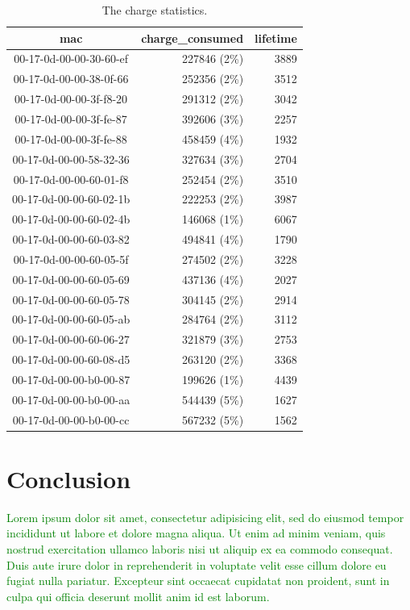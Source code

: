 \documentclass{sig-alternate}
\newcommand{\lorem}               {\textcolor{green}{Lorem ipsum dolor sit amet, consectetur adipisicing elit, sed do eiusmod tempor incididunt ut labore et dolore magna aliqua. Ut enim ad minim veniam, quis nostrud exercitation ullamco laboris nisi ut aliquip ex ea commodo consequat. Duis aute irure dolor in reprehenderit in voluptate velit esse cillum dolore eu fugiat nulla pariatur. Excepteur sint occaecat cupidatat non proident, sunt in culpa qui officia deserunt mollit anim id est laborum.}}
\begin{document}
\begin{table}
  \begin{tabular}{|c|r|r|}
     \hline
     mac                     & charge\_consumed & lifetime\\
     \hline
     00-17-0d-00-00-30-60-ef & 227846 (2\%)     & 3889\\
     00-17-0d-00-00-38-0f-66 & 252356 (2\%)     & 3512\\
     00-17-0d-00-00-3f-f8-20 & 291312 (2\%)     & 3042\\
     00-17-0d-00-00-3f-fe-87 & 392606 (3\%)     & 2257\\
     00-17-0d-00-00-3f-fe-88 & 458459 (4\%)     & 1932\\
     00-17-0d-00-00-58-32-36 & 327634 (3\%)     & 2704\\
     00-17-0d-00-00-60-01-f8 & 252454 (2\%)     & 3510\\
     00-17-0d-00-00-60-02-1b & 222253 (2\%)     & 3987\\
     00-17-0d-00-00-60-02-4b & 146068 (1\%)     & 6067\\
     00-17-0d-00-00-60-03-82 & 494841 (4\%)     & 1790\\
     00-17-0d-00-00-60-05-5f & 274502 (2\%)     & 3228\\
     00-17-0d-00-00-60-05-69 & 437136 (4\%)     & 2027\\
     00-17-0d-00-00-60-05-78 & 304145 (2\%)     & 2914\\
     00-17-0d-00-00-60-05-ab & 284764 (2\%)     & 3112\\
     00-17-0d-00-00-60-06-27 & 321879 (3\%)     & 2753\\
     00-17-0d-00-00-60-08-d5 & 263120 (2\%)     & 3368\\
     00-17-0d-00-00-b0-00-87 & 199626 (1\%)     & 4439\\
     00-17-0d-00-00-b0-00-aa & 544439 (5\%)     & 1627\\
     00-17-0d-00-00-b0-00-cc & 567232 (5\%)     & 1562\\
     \hline
  \end{tabular}
  \caption{The charge statistics.}
  \label{tab:stats_charge}
\end{table}

\section{Conclusion}
\label{sec:conclusion}


\lorem




\end{document}
